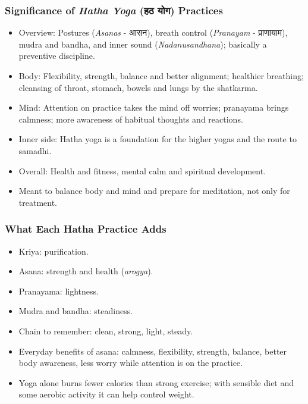 \begin{frame}[fragile]\frametitle{Significance of \textit{Hatha Yoga} (हठ योग) Practices}

\begin{itemize}
    \item Overview: Postures (\textit{Asanas} - आसन), breath control (\textit{Pranayam} - प्राणायाम), mudra and bandha, and inner sound (\textit{Nadanusandhana}); basically a preventive discipline.
    \item Body: Flexibility, strength, balance and better alignment; healthier breathing; cleansing of throat, stomach, bowels and lungs by the shatkarma.
    \item Mind: Attention on practice takes the mind off worries; pranayama brings calmness; more awareness of habitual thoughts and reactions.
    \item Inner side: Hatha yoga is a foundation for the higher yogas and the route to samadhi.
    \item Overall: Health and fitness, mental calm and spiritual development.
    \item Meant to balance body and mind and prepare for meditation, not only for treatment.
\end{itemize}

\end{frame}

\begin{frame}[fragile]\frametitle{What Each Hatha Practice Adds}

\begin{itemize}
    \item Kriya: purification.
    \item Asana: strength and health (\textit{arogya}).
    \item Pranayama: lightness.
    \item Mudra and bandha: steadiness.
    \item Chain to remember: clean, strong, light, steady.
    \item Everyday benefits of asana: calmness, flexibility, strength, balance, better body awareness, less worry while attention is on the practice.
    \item Yoga alone burns fewer calories than strong exercise; with sensible diet and some aerobic activity it can help control weight.
\end{itemize}

\end{frame}

